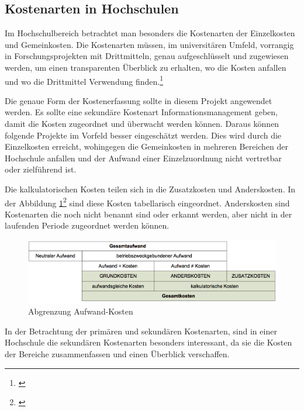 
\clearpage

\subsection{Kostenarten in Hochschulen}
Im Hochschulbereich betrachtet man besonders die Kostenarten der Einzelkosten und Gemeinkosten. Die Kostenarten müssen, im universitären Umfeld, vorrangig in Forschungsprojekten mit Drittmitteln, genau aufgeschlüsselt und zugewiesen werden, um einen transparenten Überblick zu erhalten, wo die Kosten anfallen und wo die Drittmittel Verwendung finden.\footnote{\autocite[7]{pkl_2005}}

Die genaue Form der Kostenerfassung sollte in diesem Projekt angewendet werden. Es sollte eine sekundäre Kostenart Informationsmanagement geben, damit die Kosten zugeordnet und überwacht werden können. Daraus können folgende Projekte im Vorfeld besser eingeschätzt werden. Dies wird durch die Einzelkosten erreicht, wohingegen die Gemeinkosten in mehreren Bereichen der Hochschule anfallen und der Aufwand einer Einzelzuordnung nicht vertretbar oder zielführend ist.

Die kalkulatorischen Kosten teilen sich in die Zusatzkosten und Anderskosten. In der Abbildung \ref{fig_abgrenzung_aufwand}\footnote{\autocite[9-10]{pkl_2005}} sind diese Kosten tabellarisch eingeordnet. Anderskosten sind Kostenarten die noch nicht benannt sind oder erkannt werden, aber nicht in der laufenden Periode zugeordnet werden können. 

\begin{figure}[h!]
	\centering
	\includegraphics[width=\textwidth]
	{kapitel/gruppe4_2/bilder/abgrenzung_aufwand}
	\caption{Abgrenzung Aufwand-Kosten}
	\label{fig_abgrenzung_aufwand}
\end{figure}

In der Betrachtung der primären und sekundären Kostenarten, sind in einer Hochschule die sekundären Kostenarten besonders interessant, da sie die Kosten der Bereiche zusammenfassen und einen Überblick verschaffen.

